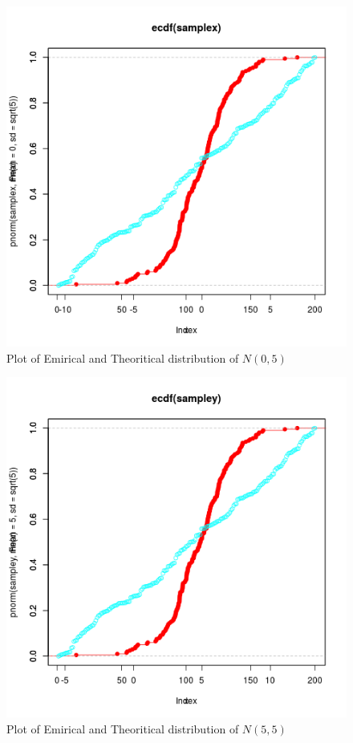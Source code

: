 \documentclass{article}
\begin{document}
			\begin{figure}[!ht]
  			\includegraphics[width=\linewidth]{pic/que2_one.png}
 			 \caption{Plot of Emirical and Theoritical distribution of $N(0,5)$} 
  			\label{fig:hist1}
		\end{figure}
		
		\begin{figure}[!ht]
  			\includegraphics[width=\linewidth]{pic/que2_two.png}
 			 \caption{Plot of Emirical and Theoritical distribution of $N(5,5)$} 
  			\label{fig:hist1}
		\end{figure}
		
\end{document}
